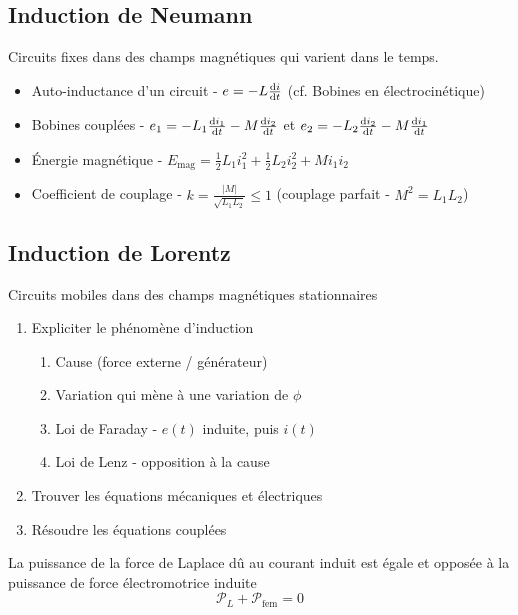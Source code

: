 \documentclass[openany]{book}
\begin{document}
\subsection{Induction de Neumann}
Circuits fixes dans des champs magnétiques qui varient dans le temps.

\begin{itemize}
    \item Auto-inductance d'un circuit - $e = - L\frac{\text{d} i}{\text{d}t}$ (cf. Bobines en électrocinétique)
    \item Bobines couplées - $e_1 = -L_1 \frac{\text{d} i_1}{\text{d}t} - M \frac{\text{d} i_2}{\text{d}t}$ et $e_2 = -L_2 \frac{\text{d} i_2}{\text{d}t} - M \frac{\text{d} i_1}{\text{d}t}$
    \item Énergie magnétique - $E_{\text{mag}} = \frac{1}{2}L_1i_1^2 + \frac{1}{2}L_2i_2^2 + Mi_1i_2$
    \item Coefficient de couplage - $k = \frac{|M|}{\sqrt{L_1L_2}} \leq 1$ (couplage parfait - $M^2 = L_1L_2$)
\end{itemize}

\subsection{Induction de Lorentz}
Circuits mobiles dans des champs magnétiques stationnaires

\begin{enumerate}
    \item Expliciter le phénomène d'induction
    \begin{enumerate}
        \item Cause (force externe / générateur)
        \item Variation qui mène à une variation de $\phi$
        \item Loi de Faraday - $e(t)$ induite, puis $i(t)$
        \item Loi de Lenz - opposition à la cause
    \end{enumerate}
    \item Trouver les équations mécaniques et électriques
    \item Résoudre les équations couplées
\end{enumerate}

La puissance de la force de Laplace dû au courant induit est égale et opposée à la puissance de force électromotrice induite 
\[ \mathcal{P}_L + \mathcal{P}_{\text{fem}} = 0 \]
\end{document}
